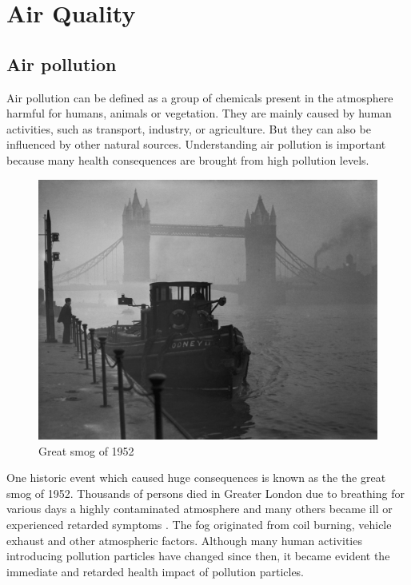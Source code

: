 \section{Air Quality}
\subsection{Air pollution}
Air pollution can be defined as a group of chemicals present in the atmosphere harmful for humans, animals or vegetation. They are mainly caused by human activities, such as transport, industry, or agriculture. But they can also be influenced by other natural sources. Understanding air pollution is important because many health consequences are brought from high pollution levels. 
\begin{figure}[h]
  \centering
  \includegraphics[scale=.8]{images/great_smog.jpg}
  \caption[Great smog of 1952]{Great smog of 1952 \cite{ElliotWagland2013}}
  \label{fig:interaction_design}
\end{figure}

One historic event which caused huge consequences is known as the the great smog of 1952. Thousands of persons died in Greater London due to  breathing for various days a highly contaminated atmosphere and many others became ill or experienced retarded symptoms \cite{Bell2008}. The fog originated from coil burning, vehicle exhaust and other atmospheric factors. Although many human activities introducing pollution particles have changed since then, it became evident the immediate and retarded health impact of pollution particles.

